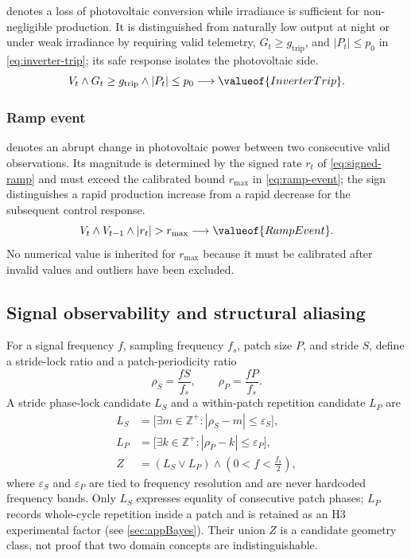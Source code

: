  denotes a loss of photovoltaic conversion while irradiance is sufficient for non-negligible production. It is distinguished from naturally low output at night or under weak irradiance by requiring valid telemetry, $G_t\geq g_{\mathrm{trip}}$, and $|P_t|\leq p_0$ in \autoref{eq:inverter-trip}; its safe response isolates the photovoltaic side.
\begin{equation}
V_t\wedge G_t\geq g_{\mathrm{trip}}\wedge |P_t|\leq p_0
\longrightarrow \valueof{InverterTrip}.
\label{eq:inverter-trip}
\end{equation}

\subsubsection{Ramp event}

 denotes an abrupt change in photovoltaic power between two consecutive valid observations. Its magnitude is determined by the signed rate $r_t$ of \autoref{eq:signed-ramp} and must exceed the calibrated bound $r_{\max}$ in \autoref{eq:ramp-event}; the sign distinguishes a rapid production increase from a rapid decrease for the subsequent control response.
\begin{equation}
V_t\wedge V_{t-1}\wedge |r_t|>r_{\max}
\longrightarrow \valueof{RampEvent}.
\label{eq:ramp-event}
\end{equation}
No numerical value is inherited for $r_{\max}$ because it must be calibrated after invalid values and outliers have been excluded.

\subsection{Signal observability and structural aliasing}

For a signal frequency $f$, sampling frequency $f_s$, patch size $P$, and stride $S$, define a stride-lock ratio and a patch-periodicity ratio
\begin{equation}
\rho_S=\frac{fS}{f_s},
\qquad
\rho_P=\frac{fP}{f_s}.
\label{eq:locking-ratio}
\end{equation}
A stride phase-lock candidate $L_S$ and a within-patch repetition candidate $L_P$ are
\begin{equation}
\begin{aligned}
L_S&=\big[\exists m\in\mathbb{Z}^{+}:|\rho_S-m|\leq\varepsilon_S\big],\\
L_P&=\big[\exists k\in\mathbb{Z}^{+}:|\rho_P-k|\leq\varepsilon_P\big],\\
Z&=(L_S\vee L_P)\wedge\left(0<f<\frac{f_s}{2}\right),
\end{aligned}
\label{eq:locking-candidate}
\end{equation}
where $\varepsilon_S$ and $\varepsilon_P$ are tied to frequency resolution and are never hardcoded frequency bands. Only $L_S$ expresses equality of consecutive patch phases; $L_P$ records whole-cycle repetition inside a patch and is retained as an H3 experimental factor (see \autoref{sec:appBayes}). Their union $Z$ is a candidate geometry class, not proof that two domain concepts are indistinguishable.

